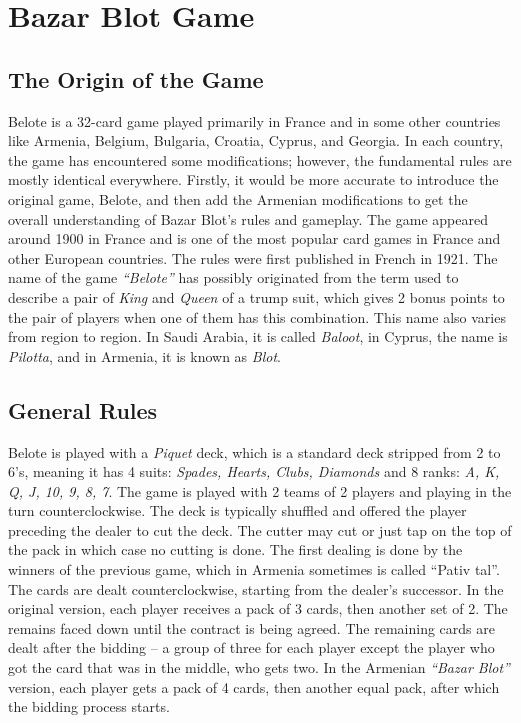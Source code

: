 \section{Bazar Blot Game}\label{GameIntro}\thispagestyle{SectionFirstPage} %
\subsection{The Origin of the Game}
\hspace{\parindent} Belote is a 32-card game played primarily in France and in some other countries like Armenia, Belgium, Bulgaria, Croatia, Cyprus, and Georgia.
In each country, the game has encountered some modifications; however, the fundamental rules are mostly identical everywhere.
Firstly, it would be more accurate to introduce the original game, Belote, and then add the Armenian modifications to get the overall understanding of Bazar Blot's rules and gameplay.
The game appeared around 1900 in France and is one of the most popular card games in France and other European countries.
The rules were first published in French in 1921.
The name of the game \textit{``Belote''} has possibly originated from the term used to describe a pair of \textit{King} and \textit{Queen} of a trump suit, which gives 2 bonus points to the pair of players when one of them has this combination.
This name also varies from region to region.
In Saudi Arabia, it is called \textit{Baloot}, in Cyprus, the name is \textit{Pilotta}, and in Armenia, it is known as \textit{Blot}.

\subsection{General Rules}
\hspace{\parindent} Belote is played with a \textit{Piquet} deck, which is a standard deck stripped from 2 to 6's, meaning it has 4 suits: \textit{Spades, Hearts, Clubs, Diamonds} and 8 ranks: \textit{A, K, Q, J, 10, 9, 8, 7}.
The game is played with 2 teams of 2 players and playing in the turn counterclockwise.
The deck is typically shuffled and offered the player preceding the dealer to cut the deck.
The cutter may cut or just tap on the top of the pack in which case no cutting is done.
The first dealing is done by the winners of the previous game, which in Armenia sometimes is called ``Pativ tal''.
The cards are dealt counterclockwise, starting from the dealer's successor.
In the original version, each player receives a pack of 3 cards, then another set of 2.
The remains faced down until the contract is being agreed.
The remaining cards are dealt after the bidding – a group of three for each player except the player who got the card that was in the middle, who gets two.
In the Armenian \textit{``Bazar Blot''} version, each player gets a pack of 4 cards, then another equal pack, after which the bidding process starts.

